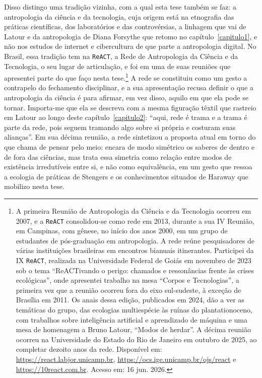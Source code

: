 Disso distingo uma tradição vizinha, com a qual esta tese também se faz: a antropologia da ciência e da tecnologia, cuja origem está na etnografia das práticas científicas, dos laboratórios e das controvérsias, a linhagem que vai de Latour e da antropologia de Diana Forsythe que retomo no capítulo~\ref{capitulo1}, e não nos estudos de internet e cibercultura de que parte a antropologia digital. No Brasil, essa tradição tem na \texttt{ReACT}, a Rede de Antropologia da Ciência e da Tecnologia, o seu lugar de articulação, e foi em uma de suas reuniões que apresentei parte do que faço nesta tese.\footnote{A primeira Reunião de Antropologia da Ciência e da Tecnologia ocorreu em 2007, e a \texttt{ReACT} consolidou-se como rede em 2013, durante a sua IV Reunião, em Campinas, com gênese, no início dos anos 2000, em um grupo de estudantes de pós-graduação em antropologia. A rede reúne pesquisadores de várias instituições brasileiras em encontros bianuais itinerantes. Participei da IX \texttt{ReACT}, realizada na Universidade Federal de Goiás em novembro de 2023 sob o tema \enquote{ReACTivando o perigo: chamados e ressonâncias frente às crises ecológicas}, onde apresentei trabalho na mesa \enquote{Corpos e Tecnologias}, a primeira vez que a reunião ocorreu fora do eixo sul-sudeste, à exceção de Brasília em 2011. Os anais dessa edição, publicados em 2024, dão a ver as temáticas do grupo, das ecologias multiespécie às ruínas do plantationoceno, com trabalhos sobre inteligência artificial e aprendizado de máquina e uma mesa de homenagem a Bruno Latour, \enquote{Modos de herdar}. A décima reunião ocorreu na Universidade do Estado do Rio de Janeiro em outubro de 2025, ao completar dezoito anos da rede. Disponível em: \url{https://react.labjor.unicamp.br}, \url{https://ocs.ige.unicamp.br/ojs/react} e \url{https://10react.com.br}. Acesso em: 16 jun. 2026.} A rede se constituiu como um gesto a contrapelo do fechamento disciplinar, e a sua apresentação recusa definir o que a antropologia da ciência é para afirmar, em vez disso, aquilo em que ela pode se tornar. Importa-me que ela se descreva com a mesma figuração têxtil que rastreio em Latour ao longo deste capítulo~\ref{capitulo2}: \enquote{aqui, rede é trama e a trama é parte da rede, pois seguem tramando algo sobre si própria e costuram suas alianças}. Em sua décima reunião, a rede sintetizou a proposta atual em torno do que chama de pensar pelo meio: encara de modo simétrico os saberes de dentro e de fora das ciências, mas trata essa simetria como relação entre modos de existência irredutíveis entre si, e não como equivalência, em um gesto que ressoa a ecologia de práticas de Stengers e os conhecimentos situados de Haraway que mobilizo nesta tese.

